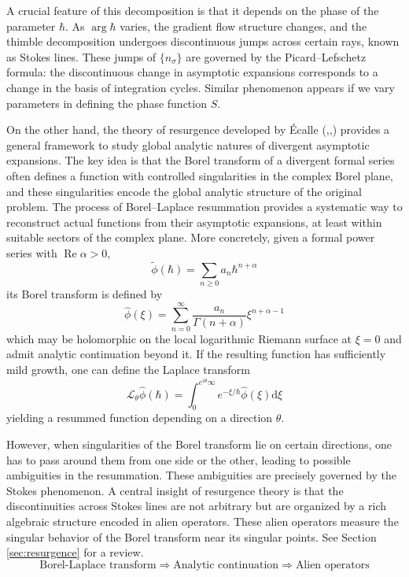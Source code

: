 \documentclass[11pt]{amsart}
\theoremstyle{plain}
\newcommand{\dd}{\mathrm d}
\newcommand{\re}{\operatorname{Re}}
\begin{document}
A crucial feature of this decomposition is that it depends on the phase of the parameter $\hbar$. As $\arg \hbar$ varies, the gradient flow structure changes, and the thimble decomposition undergoes discontinuous jumps across certain rays, known as Stokes lines. These jumps of $\{n_\sigma\}$ are governed by the Picard–Lefschetz formula: the discontinuous change in asymptotic expansions corresponds to a change in the basis of integration cycles. Similar phenomenon appears if we vary parameters in defining the phase function $S$.

On the other hand, the theory of resurgence developed by \'Ecalle (\cite{Ecalle81a},\cite{Ecalle81b},\cite{Ecalle85}) provides a general framework to study global analytic natures of divergent asymptotic expansions.  The key idea is that the Borel transform of a divergent formal series often defines a function with controlled singularities in the complex Borel plane, and these singularities encode the global analytic structure of the original problem. The process of Borel–Laplace resummation provides a systematic way to reconstruct actual functions from their asymptotic expansions, at least within suitable sectors of the complex plane. More concretely, given a formal power series with $\re \alpha>0$,
$$
\tilde\phi(\hbar)=\sum_{n\geq 0} a_n \hbar^{n+\alpha}
$$
its Borel transform is defined by 
$$
\hat \phi(\xi)=\sum_{n=0}^\infty \frac{a_n}{\Gamma(n+\alpha)}\xi^{n+\alpha-1}
$$
which may be holomorphic on the local logarithmic Riemann surface at $\xi=0$ and admit analytic continuation beyond it. If the resulting function has sufficiently mild growth, one can define the Laplace transform
$$
\mathcal L_\theta\hat\phi(\hbar)=\int_0^{e^{i\theta}\infty}e^{-\xi/\hbar} \hat\phi(\xi)\dd\xi
$$
yielding a resummed function depending on a direction $\theta$. 

However, when singularities of the Borel transform lie on certain directions,
one has to pass around them from one side or the other, leading to possible
ambiguities in the resummation.
These ambiguities are precisely governed by the Stokes phenomenon. A central insight of resurgence theory is that the discontinuities across Stokes lines are not arbitrary but are organized by a rich algebraic structure encoded in alien operators. These alien operators measure the singular behavior of the Borel transform near its singular points. See Section \ref{sec:resurgence} for a review. 
$$
\text{Borel-Laplace transform}\Longrightarrow \text{Analytic continuation}\Longrightarrow \text{Alien operators} 
$$
\end{document}
